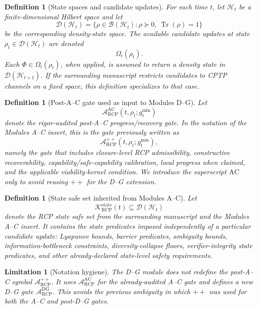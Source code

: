 \documentclass[11pt]{article}
\newtheorem{definition}[theorem]{Definition}
\newtheorem{limitation}[theorem]{Limitation}
\newcommand{\D}{\mathcal{D}}
\newcommand{\Hcal}{\mathcal{H}}
\newcommand{\K}{\mathcal{K}}
\newcommand{\Acal}{\mathcal{A}}
\newcommand{\Tr}{\operatorname{Tr}}
\newcommand{\1}{\mathbf{1}}
\newcommand{\RCP}{\mathrm{RCP}}
\newcommand{\state}{\mathrm{state}}
\providecommand{\AC}{\mathrm{AC}}
\providecommand{\DG}{\mathrm{DG}}
\begin{document}
\begin{definition}[State spaces and candidate updates]
\label{def:DG_state_spaces_candidate_updates}
For each time \(t\), let \(\Hcal_t\) be a finite-dimensional Hilbert space and let
\[
\D(\Hcal_t)=\{\rho\in\mathcal B(\Hcal_t):\rho\succeq0,\ \Tr(\rho)=1\}
\]
be the corresponding density-state space.  The available candidate updates at state \(\rho_t\in\D(\Hcal_t)\) are denoted
\[
\Omega_t(\rho_t).
\]
Each \(\Phi\in\Omega_t(\rho_t)\), when applied, is assumed to return a density state in \(\D(\Hcal_{t+1})\).  If the surrounding manuscript restricts candidates to CPTP channels on a fixed space, this definition specializes to that case.
\end{definition}

\begin{definition}[Post-A--C gate used as input to Modules D--G]
\label{def:AC_gate_alias_for_DG}
Let
\[
\Acal_{\RCP}^{\AC}(t,\rho_t;g_t^{\min})
\]
denote the rigor-audited post-A--C progress/recovery gate.  In the notation of the Modules A--C insert, this is the gate previously written as
\[
\Acal_{\RCP}^{++}(t,\rho_t;g_t^{\min}),
\]
namely the gate that includes closure-level RCP admissibility, constructive recoverability, capability/safe-capability calibration, local progress when claimed, and the applicable viability-kernel condition.  We introduce the superscript \(\AC\) only to avoid reusing \(++\) for the D--G extension.
\end{definition}

\begin{definition}[State safe set inherited from Modules A--C]
\label{def:DG_state_safe_set_inherited}
Let
\[
\K_{\RCP}^{\state}(t)\subseteq\D(\Hcal_t)
\]
denote the RCP state safe set from the surrounding manuscript and the Modules A--C insert.  It contains the state predicates imposed independently of a particular candidate update: Lyapunov bounds, barrier predicates, ambiguity bounds, information-bottleneck constraints, diversity-collapse floors, verifier-integrity state predicates, and other already-declared state-level safety requirements.
\end{definition}

\begin{limitation}[Notation hygiene]
The D--G module does not redefine the post-A--C symbol \(\Acal_{\RCP}^{++}\).  It uses \(\Acal_{\RCP}^{\AC}\) for the already-audited A--C gate and defines a new D--G gate \(\Acal_{\RCP}^{\DG}\).  This avoids the previous ambiguity in which \(++\) was used for both the A--C and post-D--G gates.
\end{limitation}
\end{document}
